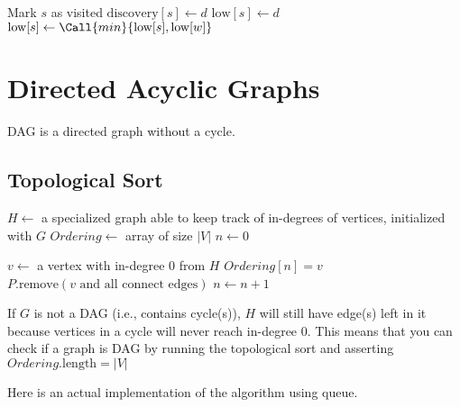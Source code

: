 \noindent \hrulefill
\begin{algorithmic}[1]
   
  \State Mark $s$ as visited
  \State $\mathrm{discovery}[s] \gets d$
  \State $\mathrm{low}[s] \gets d$
    \EndIf
    \State $\mathrm{low}[s] \gets \Call{min}{\mathrm{low}[s], \mathrm{low}[w]}$
        \State {}
      \EndIf
    \EndIf
  \EndFor
  \EndFunction
\end{algorithmic}
\noindent \hrulefill

\section{Directed Acyclic Graphs}

DAG is a directed graph without a cycle.

\subsection{Topological Sort}

\noindent \hrulefill
\begin{algorithmic}[1]
   
    \State $H \gets$ a specialized graph able to keep track of in-degrees of vertices, initialized with $G$
    \State $Ordering \gets$ array of size $|V|$
    \State $n \gets 0$
    \item[]
      \State $v \gets$ a vertex with in-degree 0 from $H$
      \State $Ordering[n] = v$
      \State $P.\text{remove}(v \text{ and all connect edges})$
      \State $n \gets n + 1$
    \EndWhile
  \EndFunction
\end{algorithmic}
\noindent \hrulefill

\noindent If $G$ is not a DAG (i.e., contains cycle(s)), $H$ will still have edge(s) left in it because vertices in a cycle will never reach in-degree 0.
This means that you can check if a graph is DAG by running the topological sort and asserting $Ordering.\text{length} = |V|$

\noindent Here is an actual implementation of the algorithm using queue.

